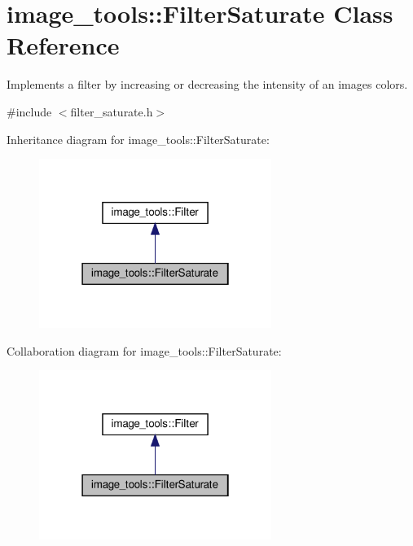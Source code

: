 \hypertarget{classimage__tools_1_1FilterSaturate}{}\section{image\+\_\+tools\+:\+:Filter\+Saturate Class Reference}
\label{classimage__tools_1_1FilterSaturate}


Implements a filter by increasing or decreasing the intensity of an image\textquotesingle{}s colors.  




{\ttfamily \#include $<$filter\+\_\+saturate.\+h$>$}



Inheritance diagram for image\+\_\+tools\+:\+:Filter\+Saturate\+:
\nopagebreak
\begin{figure}[H]
\begin{center}
\leavevmode
\includegraphics[width=214pt]{classimage__tools_1_1FilterSaturate__inherit__graph}
\end{center}
\end{figure}


Collaboration diagram for image\+\_\+tools\+:\+:Filter\+Saturate\+:
\nopagebreak
\begin{figure}[H]
\begin{center}
\leavevmode
\includegraphics[width=214pt]{classimage__tools_1_1FilterSaturate__coll__graph}
\end{center}
\end{figure}
